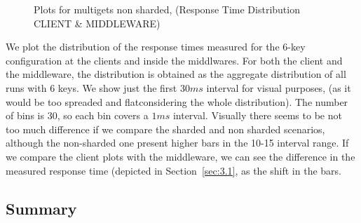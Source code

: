 \documentclass[11pt,a4paper]{article}
\begin{document}
\begin{figure}[!h]
  \centering
    \caption{Plots for multigets non sharded, (Response Time Distribution CLIENT \& MIDDLEWARE)}
  \label{fig:multigets_non_sharded_mt_mw_rt_d}
\end{figure}

We plot the distribution of the response times measured for the 6-key configuration at the clients and inside the middlwares.
For both the client and the middleware, the distribution is obtained as the aggregate distribution of all runs with 6 keys. We show just the first $30 ms$ interval for visual purposes, (as it would be too spreaded and flatconsidering the whole distribution). The number of bins is 30, so each bin covers a $1 ms$ interval.
Visually there seems to be not too much difference if we compare the sharded and non sharded scenarios, although the non-sharded one present higher bars in the 10-15 interval range.
If we compare the client plots with the middleware, we can see the difference in the measured response time (depicted in Section~\ref{sec:3.1}, as the shift in the bars.

\subsection{Summary}
\end{document}
